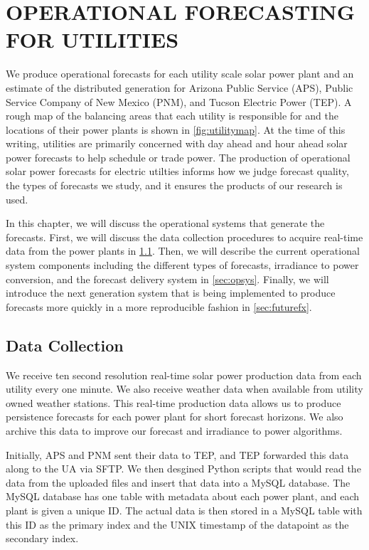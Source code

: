 \chapter{OPERATIONAL FORECASTING FOR UTILITIES}
\label{chap:operations}

We produce operational forecasts for each utility scale solar power
plant and an estimate of the distributed generation for Arizona Public
Service (APS), Public Service Company of New Mexico (PNM), and Tucson
Electric Power (TEP).
A rough map of the balancing areas that each utility is responsible
for and the locations of their power plants is shown in
\cref{fig:utilitymap}.
At the time of this writing, utilities are primarily concerned with
day ahead and hour ahead solar power forecasts to help schedule or
trade power.
The production of operational solar power forecasts for electric
utilties informs how we judge forecast quality, the types of
forecasts we study, and it ensures the products of our research is
used.

In this chapter, we will discuss the operational systems that generate
the forecasts.
First, we will discuss the data collection procedures to acquire
real-time data from the power plants in \cref{sec:datacollection}.
Then, we will describe the current operational system components
including the different types of forecasts, irradiance to power
conversion, and the forecast delivery system in \cref{sec:opsys}.
Finally, we will introduce the next generation system that is being
implemented to produce forecasts more quickly in a more reproducible
fashion in \cref{sec:futurefx}.

\section{Data Collection}
\label{sec:datacollection}

We receive ten second resolution real-time solar power production data
from each utility every one minute.
We also receive weather data when available from utility owned weather
stations.
This real-time production data allows us to produce persistence
forecasts for each power plant for short forecast horizons.
We also archive this data to improve our forecast and irradiance to
power algorithms.

Initially, APS and PNM sent their data to TEP, and TEP forwarded this
data along to the UA via SFTP.
We then desgined Python scripts that would read the data from the
uploaded files and insert that data into a MySQL database.
The MySQL database has one table with metadata about each power plant,
and each plant is given a unique ID.
The actual data is then stored in a MySQL table with this ID as the
primary index and the UNIX timestamp of the datapoint as the secondary
index.

